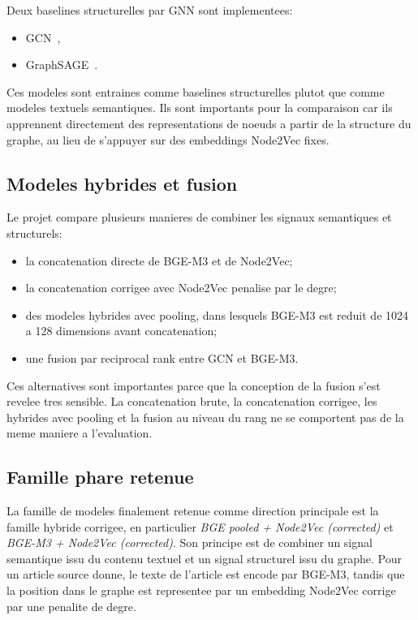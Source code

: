 Deux baselines structurelles par GNN sont implementees:
\begin{itemize}
    \item GCN~\cite{kipf2017semi},
    \item GraphSAGE~\cite{hamilton2017inductive}.
\end{itemize}

Ces modeles sont entraines comme baselines structurelles plutot que comme
modeles textuels semantiques. Ils sont importants pour la comparaison car ils
apprennent directement des representations de noeuds a partir de la structure
du graphe, au lieu de s'appuyer sur des embeddings Node2Vec fixes.

\subsection{Modeles hybrides et fusion}

Le projet compare plusieurs manieres de combiner les signaux semantiques et
structurels:
\begin{itemize}
    \item la concatenation directe de BGE-M3 et de Node2Vec;
    \item la concatenation corrigee avec Node2Vec penalise par le degre;
    \item des modeles hybrides avec pooling, dans lesquels BGE-M3 est reduit de
    1024 a 128 dimensions avant concatenation;
    \item une fusion par reciprocal rank entre GCN et BGE-M3.
\end{itemize}

Ces alternatives sont importantes parce que la conception de la fusion s'est
revelee tres sensible. La concatenation brute, la concatenation corrigee, les
hybrides avec pooling et la fusion au niveau du rang ne se comportent pas de la
meme maniere a l'evaluation.

\subsection{Famille phare retenue}

La famille de modeles finalement retenue comme direction principale est la
famille hybride corrigee, en particulier \textit{BGE pooled + Node2Vec
(corrected)} et \textit{BGE-M3 + Node2Vec (corrected)}. Son principe est de
combiner un signal semantique issu du contenu textuel et un signal structurel
issu du graphe. Pour un article source donne, le texte de l'article est encode
par BGE-M3, tandis que la position dans le graphe est representee par un
embedding Node2Vec corrige par une penalite de degre.

